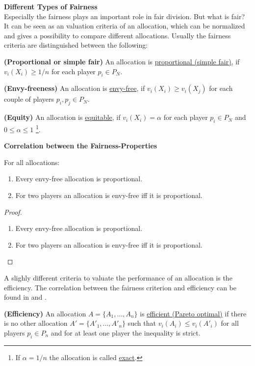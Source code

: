 \textbf{Different Types of Fairness}\\
\newline
Especially the fairness plays an important role in fair division. But what is fair? It can be seen as an valuation criteria of an allocation, which can be normalized and gives a possibility to compare different allocations. Usually the fairness criteria are distinguished between the following:\\
\begin{defi}{\textbf{(Proportional or simple fair)}}
\newline An allocation is \underline{proportional (simple fair)}, if
$v_i(X_i) \geq 1/n$ for each player $p_i \in P_N$.
\end{defi}
\begin{defi}{\textbf{(Envy-freeness)}}
\newline An allocation is \underline{envy-free}, if $v_i(X_i) \geq
v_i(X_j)$ for each couple of players $p_i, p_j \in P_N$.
\end{defi}
\begin{defi}{\textbf{(Equity)}}
\newline An allocation is \underline{equitable}, if $v_i(X_i) =
\alpha$ for each player $p_i \in P_N$ and $0 \leq \alpha \leq 1$ \footnote{ If $\alpha = 1/n$ the allocation is called \underline{exact}.}.
\end{defi}
%
\textbf{Correlation between the Fairness-Properties}
\begin{lem}
For all allocations:
\begin{enumerate}
\item Every envy-free allocation is proportional.
\item For two players an allocation is envy-free iff it is proportional.
\end{enumerate}
\end{lem}
\begin{proof}
\begin{enumerate}
\item Every envy-free allocation is proportional.
\item For two players an allocation is envy-free iff it is proportional.
\end{enumerate}
\end{proof}
A slighly different criteria to valuate the performance of an allocation is the efficiency. The correlation between the fairness criterion and efficiency can be found in \cite{chen:truth} and \cite{brams}. 
\begin{defi}{\textbf{(Efficiency)}}
\newline An allocation $A=\{A_1,\dots, A_n\}$ is \underline{efficient (Pareto optimal)} if there is no other allocation $A'=\{A'_1,\dots, A'_n\}$ such that $v_i(A_i)\leq v_i(A'_i)$ for all players $p_i \in P_n$ and for at least one player the inequality is strict.
\end{defi}
